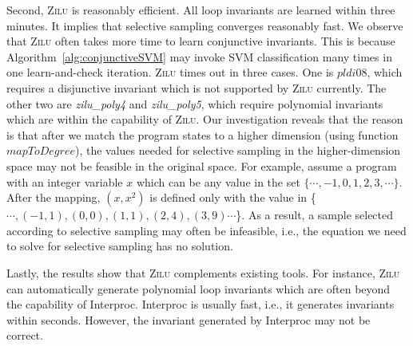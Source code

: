 Second, \textsc{Zilu} is reasonably efficient. All loop invariants are learned within three minutes. It implies that selective sampling converges reasonably fast.
We observe that \textsc{Zilu} often takes more time to learn conjunctive invariants. This is because Algorithm~\ref{alg:conjunctiveSVM} may invoke SVM classification many times in one learn-and-check iteration.
\textsc{Zilu} times out in three cases. One is $pldi08$, which requires a disjunctive invariant which is not supported by \textsc{Zilu} currently. The other two are \emph{zilu\_poly4} and \emph{zilu\_poly5}, which require polynomial invariants which are within the capability of \textsc{Zilu}. Our investigation reveals that the reason is that after we match the program states to a higher dimension (using function $mapToDegree$), the values needed for selective sampling in the higher-dimension space may not be feasible in the original space. For example, assume a program with an integer variable $x$ which can be any value in the set $\{\cdots, -1, 0,  1, 2, 3, \cdots\}$. After the mapping, $(x, x^2)$ is defined only with the value in \{$\cdots, (-1,1), (0,0), (1,1), (2, 4), (3, 9)\cdots$\}. As a result, a sample selected according to selective sampling may often be infeasible, i.e., the equation we need to solve for selective sampling has no solution.

Lastly, the results show that \textsc{Zilu} complements existing tools. For instance, \textsc{Zilu} can automatically generate polynomial loop invariants
which are often beyond the capability of Interproc. Interproc is usually fast, i.e., it generates invariants within seconds. However, the invariant generated by Interproc may not be correct.

